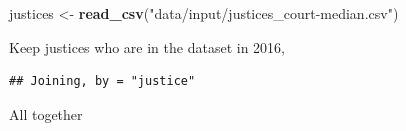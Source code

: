\documentclass[]{book}
\newenvironment{Shaded}{\begin{snugshade}}{\end{snugshade}}
\newcommand{\KeywordTok}[1]{\textcolor[rgb]{0.13,0.29,0.53}{\textbf{#1}}}
\newcommand{\DataTypeTok}[1]{\textcolor[rgb]{0.13,0.29,0.53}{#1}}
\newcommand{\DecValTok}[1]{\textcolor[rgb]{0.00,0.00,0.81}{#1}}
\newcommand{\StringTok}[1]{\textcolor[rgb]{0.31,0.60,0.02}{#1}}
\newcommand{\CommentTok}[1]{\textcolor[rgb]{0.56,0.35,0.01}{\textit{#1}}}
\newcommand{\OperatorTok}[1]{\textcolor[rgb]{0.81,0.36,0.00}{\textbf{#1}}}
\newcommand{\NormalTok}[1]{#1}
\theoremstyle{definition}
\theoremstyle{definition}
\theoremstyle{definition}
\theoremstyle{remark}
\begin{document}
\begin{Shaded}
\begin{Highlighting}[]
\NormalTok{justices <-}\StringTok{ }\KeywordTok{read_csv}\NormalTok{(}\StringTok{"data/input/justices_court-median.csv"}\NormalTok{)}
\end{Highlighting}
\end{Shaded}

Keep justices who are in the dataset in 2016,

\begin{Shaded}
\end{Shaded}

\begin{verbatim}
## Joining, by = "justice"
\end{verbatim}

All together
\end{document}
